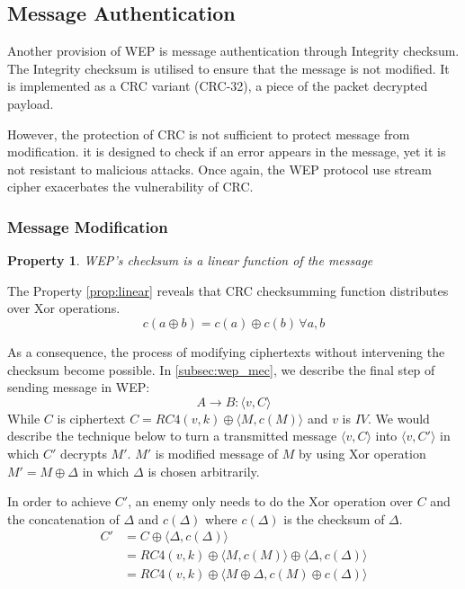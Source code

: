 \subsection{Message Authentication}
Another provision of \ac{WEP} is message authentication through Integrity checksum. The Integrity checksum is utilised to ensure that the message is not modified. It is implemented as a \ac{CRC} variant (\ac{CRC}-32), a piece of the packet decrypted payload.

However, the protection of \ac{CRC} is not sufficient to protect message from modification. it is designed to check if an error appears in the message, yet it is not resistant to malicious attacks. Once again, the \ac{WEP} protocol use stream cipher exacerbates the vulnerability of \ac{CRC}.

\subsubsection{Message Modification}\label{subsub:mess_modi}
\newtheorem{property}{Property}

\begin{property}
	\ac{WEP}'s checksum is a linear function of the message
	\label{prop:linear}
\end{property}

The Property \autoref{prop:linear} reveals that \ac{CRC} checksumming function distributes over \ac{Xor} operations.
\begin{equation}
	c(a\oplus b) = c(a) \oplus c(b)\, \forall a,b
	\label{equation:linear_prop}
\end{equation}

As a consequence, the process of modifying ciphertexts without intervening the checksum become possible. In \autoref{subsec:wep_mec}, we describe the final step of sending message in \ac{WEP}:
\begin{equation}
	A \rightarrow B : \langle v,C \rangle 
\end{equation}
While $C$ is ciphertext $C = RC4(v,k) \oplus \langle M, c(M) \rangle $ and $v$ is $IV$. We would describe the technique below to turn a transmitted message $\langle v, C \rangle $ into $\langle v, C' \rangle $ in which $C'$ decrypts $M'$. $M'$ is modified message of $M$ by using \ac{Xor} operation $M' = M\oplus \Delta$ in which $\Delta$ is chosen arbitrarily.

In order to achieve $C'$, an enemy only needs to do the \ac{Xor} operation over $C$ and the concatenation of $\Delta$ and $c(\Delta)$ where $c(\Delta)$ is the checksum of $\Delta$.
\begin{align}
	C' &= C \oplus \langle\Delta, c(\Delta)\rangle\\
	&= RC4(v, k) \oplus \langle M, c(M)\rangle \oplus \langle\Delta, c(\Delta)\rangle \label{equation:xor_application}\\	
	&= RC4(v, k) \oplus \langle M \oplus \Delta, c(M) \oplus c(\Delta) \rangle
	\label{equation:xor_delta_result} 
\end{align}

